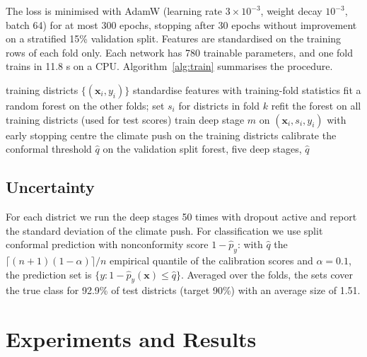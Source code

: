 \documentclass[conference]{IEEEtran}
\begin{document}
The loss is minimised with AdamW (learning rate $3\times10^{-3}$, weight decay $10^{-3}$, batch 64) for at most 300 epochs, stopping after 30 epochs without improvement on a stratified 15\% validation split. Features are standardised on the training rows of each fold only. Each network has 780 trainable parameters, and one fold trains in 11.8 s on a CPU. Algorithm~\ref{alg:train} summarises the procedure.

\begin{algorithm}[t]
\caption{Training B-ACPN on one fold}
\label{alg:train}
\begin{algorithmic}[1]
\REQUIRE training districts $\{(\mathbf{x}_i, y_i)\}$
\STATE standardise features with training-fold statistics
  \STATE fit a random forest on the other folds; set $s_i$ for districts in fold $k$
\ENDFOR
\STATE refit the forest on all training districts (used for test scores)
  \STATE train deep stage $m$ on $(\mathbf{x}_i, s_i, y_i)$ with early stopping
\ENDFOR
\STATE centre the climate push on the training districts
\STATE calibrate the conformal threshold $\hat q$ on the validation split
\RETURN forest, five deep stages, $\hat q$
\end{algorithmic}
\end{algorithm}

\subsection{Uncertainty}
For each district we run the deep stages 50 times with dropout active and report the standard deviation of the climate push. For classification we use split conformal prediction with nonconformity score $1-\hat p_{y}$: with $\hat q$ the $\lceil (n+1)(1-\alpha)\rceil/n$ empirical quantile of the calibration scores and $\alpha = 0.1$, the prediction set is $\{y : 1-\hat p_y(\mathbf{x}) \le \hat q\}$. Averaged over the folds, the sets cover the true class for 92.9\% of test districts (target 90\%) with an average size of 1.51.

\section{Experiments and Results}
\end{document}

